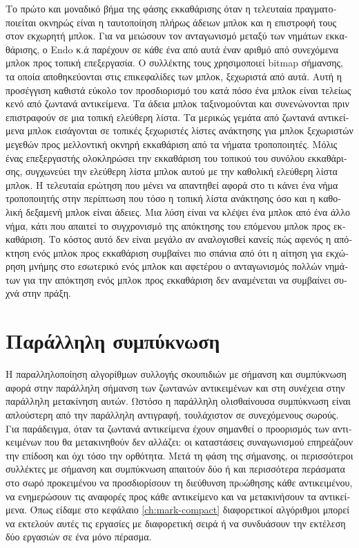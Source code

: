 \begin{greek}
 Το πρώτο και μοναδικό βήμα της φάσης εκκαθάρισης όταν η τελευταία
 πραγματοποιείται οκνηρώς είναι η ταυτοποίηση πλήρως άδειων μπλοκ
 και η επιστροφή τους στον εκχωρητή μπλοκ. Για να μειώσουν τον
 ανταγωνισμό μεταξύ των νημάτων εκκαθάρισης, ο Endo κ.ά \cite{DBLP:conf/sc/EndoTY97}
 παρέχουν σε κάθε ένα από αυτά έναν αριθμό από συνεχόμενα μπλοκ
 προς τοπική επεξεργασία. Ο συλλέκτης τους χρησιμοποιεί bitmap
 σήμανσης, τα οποία αποθηκεύονται στις επικεφαλίδες των μπλοκ,
 ξεχωριστά από αυτά. Αυτή η προσέγγιση καθιστά εύκολο τον προσδιορισμό
 του κατά πόσο ένα μπλοκ είναι τελείως κενό από ζωντανά αντικείμενα.
 Τα άδεια μπλοκ ταξινομούνται και συνενώνονται πριν επιστραφούν
 σε μια τοπική ελεύθερη λίστα. Τα μερικώς γεμάτα από ζωντανά
 αντικείμενα μπλοκ εισάγονται σε τοπικές ξεχωριστές λίστες ανάκτησης
 για μπλοκ ξεχωριστών μεγεθών προς μελλοντική οκνηρή εκκαθάριση
 από τα νήματα τροποποιητές. Μόλις ένας επεξεργαστής ολοκληρώσει
 την εκκαθάριση του τοπικού του συνόλου εκκαθάρισης, συγχωνεύει
 την ελεύθερη λίστα μπλοκ αυτού με την καθολική ελεύθερη λίστα
 μπλοκ. Η τελευταία ερώτηση που μένει να απαντηθεί αφορά στο
 τι κάνει ένα νήμα τροποποιητής στην περίπτωση που τόσο η τοπική
 λίστα ανάκτησης όσο και η καθολική δεξαμενή μπλοκ είναι άδειες.
 Μια λύση είναι να κλέψει ένα μπλοκ από ένα άλλο νήμα, κάτι που
 απαιτεί το συγχρονισμό της απόκτησης του επόμενου μπλοκ προς
 εκκαθάριση. Το κόστος αυτό δεν είναι μεγάλο αν αναλογισθεί κανείς
 πώς αφενός η απόκτηση ενός μπλοκ προς εκκαθάριση συμβαίνει πιο
 σπάνια από ότι η αίτηση για εκχώρηση μνήμης στο εσωτερικό ενός
 μπλοκ και αφετέρου ο ανταγωνισμός πολλών νημάτων για την απόκτηση
 ενός μπλοκ προς εκκαθάριση δεν αναμένεται να συμβαίνει συχνά
 στην πράξη.

 \section{Παράλληλη συμπύκνωση}
 Η παραλληλοποίηση αλγορίθμων συλλογής σκουπιδιών με σήμανση
 και συμπύκνωση αφορά στην παράλληλη σήμανση των ζωντανών αντικειμένων
 και στη συνέχεια στην παράλληλη μετακίνηση αυτών. Ωστόσο η παράλληλη
 ολισθαίνουσα συμπύκνωση είναι απλούστερη από την παράλληλη
 αντιγραφή, τουλάχιστον σε συνεχόμενους σωρούς. Για παράδειγμα,
 όταν τα ζωντανά αντικείμενα έχουν σημανθεί ο προορισμός των αντικειμένων
 που θα μετακινηθούν δεν αλλάζει: οι καταστάσεις συναγωνισμού
 επηρεάζουν την επίδοση και όχι τόσο την ορθότητα. Μετά τη
 φάση της σήμανσης, οι περισσότεροι συλλέκτες με σήμανση και
 συμπύκνωση απαιτούν δύο ή και περισσότερα περάσματα στο σωρό
 προκειμένου να προσδιορίσουν τη διεύθυνση πρoώθησης κάθε αντικειμένου,
 να ενημερώσουν τις αναφορές προς κάθε αντικείμενο και να μετακινήσουν
 τα αντικείμενα. Όπως είδαμε στο κεφάλαιο \ref{ch:mark-compact}
 διαφορετικοί αλγόριθμοι μπορεί να εκτελούν αυτές τις εργασίες
 με διαφορετική σειρά ή να συνδυάσουν την εκτέλεση δύο εργασιών
 σε ένα μόνο πέρασμα.


\end{greek}
